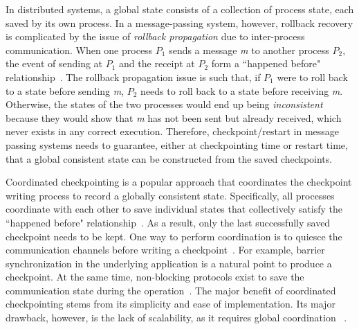In distributed systems, a global state consists of a collection of process state, each saved by its own process. In a message-passing system, however, rollback recovery is complicated by the issue of \textit{rollback propagation} due to inter-process communication. When one process $P_1$ sends a message \textit{m} to another process $P_2$, the event of sending at $P_1$ and the receipt at $P_2$ form a ``happened before" relationship~\cite{lamport_comm_1978}. The rollback propagation issue is such that, if $P_1$ were to roll back to a state before sending \textit{m}, $P_2$ needs to roll back to a state before receiving \textit{m}. Otherwise, the states of the two processes would end up being \textit{inconsistent} because they would show that \textit{m} has not been sent but already received, which never exists in any correct execution. Therefore, checkpoint/restart in message passing systems needs to guarantee, either at checkpointing time or restart time, that a global consistent state can be constructed from the saved checkpoints. %

Coordinated checkpointing is a popular approach that coordinates the checkpoint writing process to record a globally consistent state.
Specifically, all processes
coordinate with each other to save individual states that collectively satisfy the ``happened before" relationship~\cite{chandy_trans_1985}.
As a result, only the last successfully saved checkpoint needs to be kept.
One way to perform coordination is to quiesce the communication channels before writing a checkpoint~\cite{tamir1984error,hargrove2006berkeley}. For example, barrier synchronization in the underlying application is a natural point to produce a checkpoint. At the same time, non-blocking protocols exist to save the communication state during the operation~\cite{coti2006blocking,chandy_trans_1985,lai1987distributed}.
The major benefit of coordinated checkpointing stems from its simplicity and ease of implementation. 
Its major drawback, however, is the lack of scalability, as it requires global coordination
~\cite{elnozahy_dsc_2004,riesen_sandia_2010,hargrove2006berkeley}.


